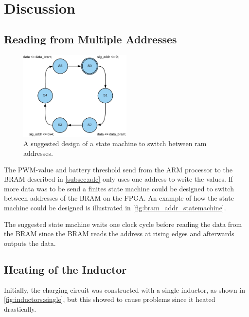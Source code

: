 \documentclass[../report.tex]{subfiles}
\begin{document}
\section{Discussion} \label{sec:discussion}
\subsection*{Reading from Multiple Addresses}
\begin{figure}
    \centering
    \includegraphics[width=0.5\textwidth]{figures/BRAM_addr_statemachine.jpg}
    \captionsetup{width=0.5\textwidth}
    \caption{A suggested design of a state machine to switch between ram addresses.}
    \label{fig:bram_addr_statemachine}
\end{figure}

The PWM-value and battery threshold send from the ARM processor to the BRAM described in \autoref{subsec:adc} only uses one address to write the values. If more data was to be send a finites state machine could be designed to switch between addresses of the BRAM on the FPGA. An example of how the state machine could be designed is illustrated in \autoref{fig:bram_addr_statemachine}. 

The suggested state machine waits one clock cycle before reading the data from the BRAM since the BRAM reads the address at rising edges and afterwards outputs the data.

\subsection*{Heating of the Inductor}
Initially, the charging circuit was constructed with a single inductor, as shown in \ref{fig:inductors:single}, but this showed to cause problems since it heated drastically.
\end{document}
